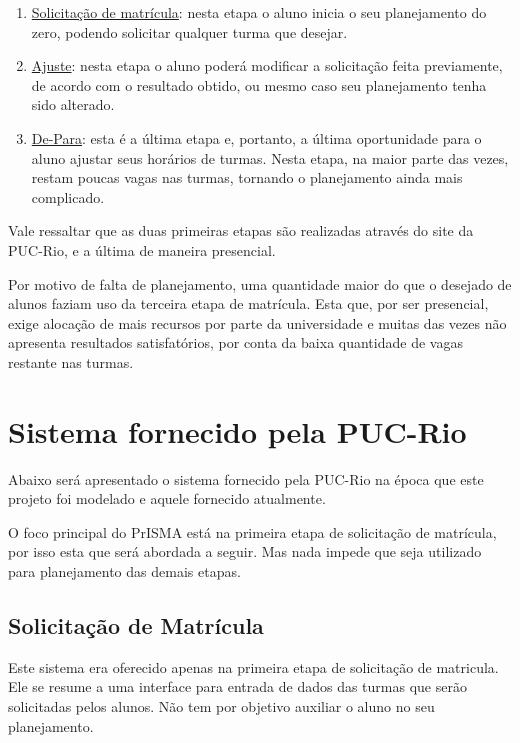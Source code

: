 \documentclass[graduacao,brazil]{ThesisPUC}
\begin{document}
\begin{enumerate}
	\item \underline{Solicitação de matrícula}: nesta etapa o aluno inicia o seu planejamento do zero, podendo solicitar qualquer turma que desejar.
	\item \underline{Ajuste}: nesta etapa o aluno poderá modificar a solicitação feita previamente, de acordo com o resultado obtido, ou mesmo caso seu planejamento tenha sido alterado.
	\item \underline{De-Para}: esta é a última etapa e, portanto, a última oportunidade para o aluno ajustar seus horários de turmas. Nesta etapa, na maior parte das vezes, restam poucas vagas nas turmas, tornando o planejamento ainda mais complicado.
\end{enumerate}

Vale ressaltar que as duas primeiras etapas são realizadas através do site da PUC-Rio, e a última de maneira presencial. 

Por motivo de falta de planejamento, uma quantidade maior do que o desejado de alunos faziam uso da terceira etapa de matrícula. Esta que, por ser presencial, exige alocação de mais recursos por parte da universidade e muitas das vezes não apresenta resultados satisfatórios, por conta da baixa quantidade de vagas restante nas turmas.

\section{Sistema fornecido pela PUC-Rio}

Abaixo será apresentado o sistema fornecido pela PUC-Rio na época que este projeto foi modelado e aquele fornecido atualmente. 

O foco principal do PrISMA está na primeira etapa de solicitação de matrícula, por isso esta que será abordada a seguir. Mas nada impede que seja utilizado para planejamento das demais etapas.

\subsection{Solicitação de Matrícula}

Este sistema era oferecido apenas na primeira etapa de solicitação de matricula. Ele se resume a uma interface para entrada de dados das turmas que serão solicitadas pelos alunos. Não tem por objetivo auxiliar o aluno no seu planejamento.
\end{document}

